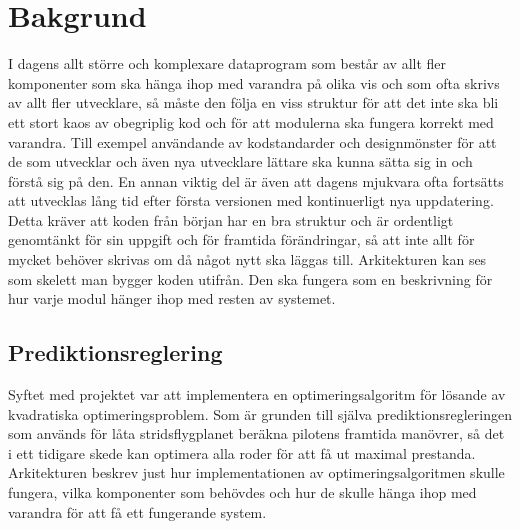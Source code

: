 \section{Bakgrund}
I dagens allt större och komplexare dataprogram som består av allt fler komponenter som ska hänga ihop med varandra på olika vis och som ofta skrivs av allt fler utvecklare, så måste den följa en viss struktur för att det inte ska bli ett stort kaos av obegriplig kod och för att modulerna ska fungera korrekt med varandra. Till exempel användande av kodstandarder och designmönster för att de som utvecklar och även nya utvecklare lättare ska kunna sätta sig in och förstå sig på den.
\newline
\newline
En annan viktig del är även att dagens mjukvara ofta fortsätts att utvecklas lång tid efter första versionen med kontinuerligt nya uppdatering. Detta kräver att koden från början har en bra struktur och är ordentligt genomtänkt för sin uppgift och för framtida förändringar, så att inte allt för mycket behöver skrivas om då något nytt ska läggas till.
\newline
\newline
Arkitekturen kan ses som skelett man bygger koden utifrån. Den ska fungera som en beskrivning för hur varje modul hänger ihop med resten av systemet.

\subsection{Prediktionsreglering}
Syftet med projektet var att implementera en optimeringsalgoritm för lösande av kvadratiska optimeringsproblem. Som är grunden till själva prediktionsregleringen som används för låta stridsflygplanet beräkna pilotens framtida manövrer, så det i ett tidigare skede kan optimera alla roder för att få ut maximal prestanda.
\newline
\newline
Arkitekturen beskrev just hur implementationen av optimeringsalgoritmen skulle fungera, vilka komponenter som behövdes och hur de skulle hänga ihop med varandra för att få ett fungerande system.

